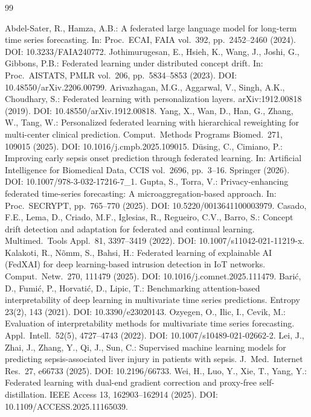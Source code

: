 \documentclass{llncs}
\renewenvironment{thebibliography}[1]{%
  \begin{origthebibliography}{#1}%
    \setlength{\itemsep}{-2.6pt plus 0.2pt}%
    \setlength{\parskip}{0pt}%
    \footnotesize\sloppy
}{%
  \end{origthebibliography}%
}
\begin{document}
\begin{thebibliography}{99}

 Abdel-Sater, R., Hamza, A.B.: A federated large language model for long-term time series forecasting. In: Proc.\ ECAI, FAIA vol.\ 392, pp.\ 2452--2460 (2024). DOI: 10.3233/FAIA240772.
 Jothimurugesan, E., Hsieh, K., Wang, J., Joshi, G., Gibbons, P.B.: Federated learning under distributed concept drift. In: Proc.\ AISTATS, PMLR vol.\ 206, pp.\ 5834--5853 (2023). DOI: 10.48550/arXiv.2206.00799.
 Arivazhagan, M.G., Aggarwal, V., Singh, A.K., Choudhary, S.: Federated learning with personalization layers. arXiv:1912.00818 (2019). DOI: 10.48550/arXiv.1912.00818.
 Yang, X., Wan, D., Han, G., Zhang, W., Tang, W.: Personalized federated learning with hierarchical reweighting for multi-center clinical prediction. Comput.\ Methods Programs Biomed.\ 271, 109015 (2025). DOI: 10.1016/j.cmpb.2025.109015.
 D\"{u}sing, C., Cimiano, P.: Improving early sepsis onset prediction through federated learning. In: Artificial Intelligence for Biomedical Data, CCIS vol.\ 2696, pp.\ 3--16. Springer (2026). DOI: 10.1007/978-3-032-17216-7\_1.
 Gupta, S., Torra, V.: Privacy-enhancing federated time-series forecasting: A microaggregation-based approach. In: Proc.\ SECRYPT, pp.\ 765--770 (2025). DOI: 10.5220/0013641100003979.
 Casado, F.E., Lema, D., Criado, M.F., Iglesias, R., Regueiro, C.V., Barro, S.: Concept drift detection and adaptation for federated and continual learning. Multimed.\ Tools Appl.\ 81, 3397--3419 (2022). DOI: 10.1007/s11042-021-11219-x.
 Kalakoti, R., N\~{o}mm, S., Bahsi, H.: Federated learning of explainable AI (FedXAI) for deep learning-based intrusion detection in IoT networks. Comput.\ Netw.\ 270, 111479 (2025). DOI: 10.1016/j.comnet.2025.111479.
 Bari\'{c}, D., Fumi\'{c}, P., Horvati\'{c}, D., Lipic, T.: Benchmarking attention-based interpretability of deep learning in multivariate time series predictions. Entropy 23(2), 143 (2021). DOI: 10.3390/e23020143.
 Ozyegen, O., Ilic, I., Cevik, M.: Evaluation of interpretability methods for multivariate time series forecasting. Appl.\ Intell.\ 52(5), 4727--4743 (2022). DOI: 10.1007/s10489-021-02662-2.
 Lei, J., Zhai, J., Zhang, Y., Qi, J., Sun, C.: Supervised machine learning models for predicting sepsis-associated liver injury in patients with sepsis. J.\ Med.\ Internet Res.\ 27, e66733 (2025). DOI: 10.2196/66733.
 Wei, H., Luo, Y., Xie, T., Yang, Y.: Federated learning with dual-end gradient correction and proxy-free self-distillation. IEEE Access 13, 162903--162914 (2025). DOI: 10.1109/ACCESS.2025.11165039.

\end{thebibliography}
\end{document}
